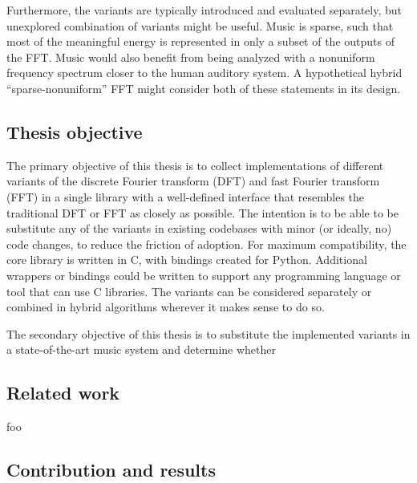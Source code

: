 \documentclass[letter,12pt,notitlepage]{article}
\begin{document}
Furthermore, the variants are typically introduced and evaluated separately, but unexplored combination of variants might be useful. Music is sparse, such that most of the meaningful energy is represented in only a subset of the outputs of the FFT. Music would also benefit from being analyzed with a nonuniform frequency spectrum closer to the human auditory system. A hypothetical hybrid ``sparse-nonuniform'' FFT might consider both of these statements in its design.

\subsection{Thesis objective}

The primary objective of this thesis is to collect implementations of different variants of the discrete Fourier transform (DFT) and fast Fourier transform (FFT) in a single library with a well-defined interface that resembles the traditional DFT or FFT as closely as possible. The intention is to be able to be substitute any of the variants in existing codebases with minor (or ideally, no) code changes, to reduce the friction of adoption. For maximum compatibility, the core library is written in C, with bindings created for Python. Additional wrappers or bindings could be written to support any programming language or tool that can use C libraries. The variants can be considered separately or combined in hybrid algorithms wherever it makes sense to do so.

The secondary objective of this thesis is to substitute the implemented variants in a state-of-the-art music system and determine whether 

\subsection{Related work}

foo

\subsection{Contribution and results}
\end{document}
